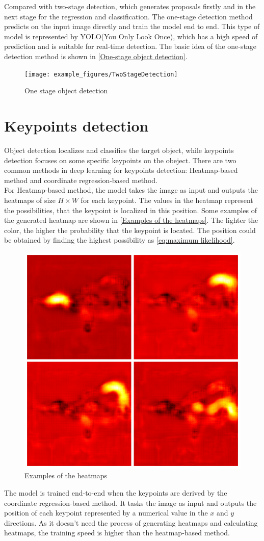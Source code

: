   Compared with two-stage detection, which generates proposals firstly and in the next stage for the regression and classification. The one-stage detection method 
  predicts on the input image directly and train the model end to end. This type of model is represented by YOLO(You Only Look Once), which has a high speed of 
  prediction and is suitable for real-time detection. The basic idea of the one-stage detection method is shown in \autoref{One-stage object detection}.
  \begin{figure}[!htbp]
    \centering
    \texttt{[image: example\_figures/TwoStageDetection]}
    \caption{One stage object detection}
    \label{One stage object detection}
  \end{figure}
\section{Keypoints detection}
  Object detection localizes and classifies the target object, while keypoints detection focuses on some specific keypoints on the obeject. There are two common methods
  in deep learning for keypoints detection: Heatmap-based method and coordinate regression-based method.\\
  For Heatmap-based method, the model takes the image as input and outputs the heatmaps of size $H\times W$ for each keypoint. The values in the heatmap represent the possibilities,
  that the keypoint is localized in this position. Some examples of the generated heatmap are shown in \autoref{Examples of the heatmaps}. The lighter the color, the higher the 
  probability that the keypoint is located. The position could be obtained by finding the highest possibility as \autoref{eq:maximum likelihood}.\\
  \begin{figure}[!htbp]
    \centering
    \includegraphics[width=0.6\linewidth]{example_images/heatmap_segment}
    \caption{Examples of the heatmaps}
    \label{Examples of the heatmaps}
  \end{figure}
  The model is trained end-to-end when the keypoints are derived by the coordinate regression-based method. It tasks the image as input and outputs the position of each 
  keypoint represented by a numerical value in the $x$ and $y$ directions. As it doesn't need the process of generating heatmaps and calculating heatmaps, the training speed is 
  higher than the heatmap-based method. 
